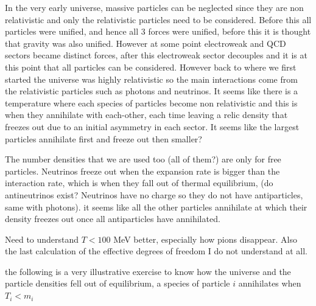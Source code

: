 \documentclass[12pt]{amsart}
\begin{document}
\begin{enumerate}
\hdashrule[0.5ex][c]{\linewidth}{0.5pt}{1.5mm}


In the very early universe, massive particles can be neglected since they are non relativistic and only the relativistic particles need to be considered. Before this all particles were unified, and hence all 3 forces were unified, before this it is thought that gravity was also unified. However at some point electroweak and QCD sectors became distinct forces, after this electroweak sector decouples and it is at this point that all particles can be considered. However back to where we first started the universe was highly relativistic so the main interactions come from the relativistic particles such as photons and neutrinos. It seems like there is a temperature where each species of particles become non relativistic and this is when they annihilate with each-other, each time leaving a relic density that freezes out due to an initial asymmetry in each sector. It seems like the largest particles annihilate first and freeze out then smaller? 

The number densities that we are used too (all of them?) are only for free particles. Neutrinos freeze out when the expansion rate is bigger than the interaction rate, which is when they fall out of thermal equilibrium, (do antineutrinos exist? Neutrinos have no charge so they do not have antiparticles, same with photons). it seems like all the other particles annihilate at which their density freezes out once all antiparticles have annihilated.

Need to understand $T<100$ MeV better, especially how pions disappear. Also the last calculation of the effective degrees of freedom I do not understand at all.

the following is a very illustrative exercise to know how the universe and the particle densities fell out of equilibrium, a species of particle $i$ annihilates when $T_i<m_i$\\


\end{enumerate}
\end{document}
